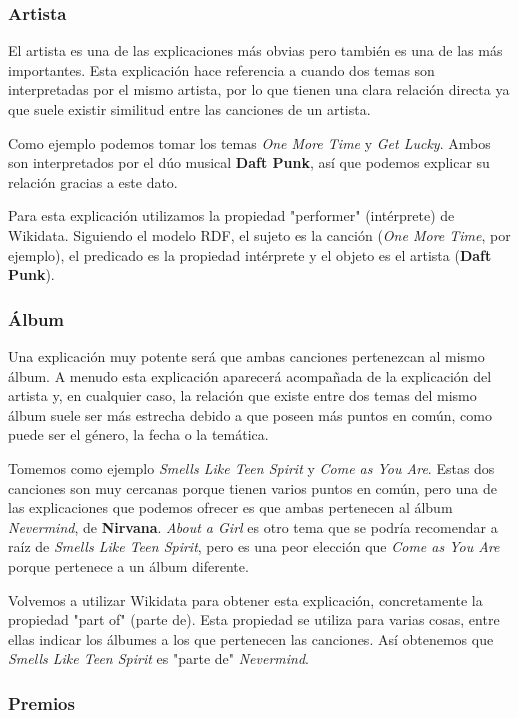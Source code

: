 \subsubsection*{Artista}

El artista es una de las explicaciones más obvias pero también es una de las más importantes. Esta explicación hace referencia a cuando dos temas son interpretadas por el mismo artista, por lo que tienen una clara relación directa ya que suele existir similitud entre las canciones de un artista.

Como ejemplo podemos tomar los temas \textit{One More Time} y \textit{Get Lucky}. Ambos son interpretados por el dúo musical \textbf{Daft Punk}, así que podemos explicar su relación gracias a este dato.

Para esta explicación utilizamos la propiedad "performer" (intérprete) de Wikidata. Siguiendo el modelo RDF, el sujeto es la canción (\textit{One More Time}, por ejemplo), el predicado es la propiedad intérprete y el objeto es el artista (\textbf{Daft Punk}). 

\subsubsection*{Álbum}

Una explicación muy potente será que ambas canciones pertenezcan al mismo álbum. A menudo esta explicación aparecerá acompañada de la explicación del artista y, en cualquier caso, la relación que existe entre dos temas del mismo álbum suele ser más estrecha debido a que poseen más puntos en común, como puede ser el género, la fecha o la temática.

Tomemos como ejemplo \textit{Smells Like Teen Spirit} y \textit{Come as You Are}. Estas dos canciones son muy cercanas porque tienen varios puntos en común, pero una de las explicaciones que podemos ofrecer es que ambas pertenecen al álbum \textit{Nevermind}, de \textbf{Nirvana}. \textit{About a Girl} es otro tema que se podría recomendar a raíz de \textit{Smells Like Teen Spirit}, pero es una peor elección que \textit{Come as You Are} porque pertenece a un álbum diferente.

Volvemos a utilizar Wikidata para obtener esta explicación, concretamente la propiedad "part of" (parte de). Esta propiedad se utiliza para varias cosas, entre ellas indicar los álbumes a los que pertenecen las canciones. Así obtenemos que \textit{Smells Like Teen Spirit} es "parte de" \textit{Nevermind}.

\subsubsection*{Premios}


